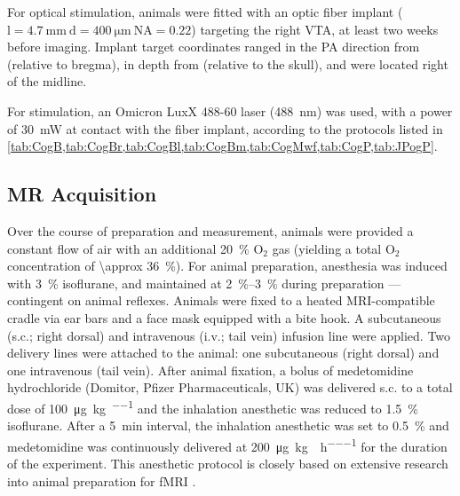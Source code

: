 For optical stimulation, animals were fitted with an optic fiber implant ($\mathrm{l=\SI{4.7}{\milli\meter} \ d=\SI{400}{\micro\meter} \ NA=0.22}$) targeting the right VTA, at least two weeks before imaging.
Implant target coordinates ranged in the PA direction from
 (relative to bregma),
in depth from
 (relative to the skull),
and were located
right of the midline.

For stimulation, an Omicron LuxX 488-60 laser (\SI{488}{\nano\meter}) was used, with a power of \SI{30}{\milli\watt} at contact with the fiber implant, according to the protocols listed in \cref{tab:CogB,tab:CogBr,tab:CogBl,tab:CogBm,tab:CogMwf,tab:CogP,tab:JPogP}.

\subsection{MR Acquisition}

Over the course of preparation and measurement, animals were provided a constant flow of air with an additional \SI{20}{\percent} $\mathrm{O_2}$ gas (yielding a total $\mathrm{O_2}$ concentration of \SI{\approx 36}{\percent}).
For animal preparation, anesthesia was induced with \SI{3}{\percent} isoflurane, and maintained at \SIrange{2}{3}{\percent} during preparation --- contingent on animal reflexes.
Animals were fixed to a heated MRI-compatible cradle via ear bars and a face mask equipped with a bite hook.
A subcutaneous (s.c.; right dorsal) and intravenous (i.v.; tail vein) infusion line were applied.
Two delivery lines were attached to the animal: one subcutaneous (right dorsal) and one intravenous (tail vein).
After animal fixation, a bolus of medetomidine hydrochloride (Domitor, Pfizer Pharmaceuticals, UK) was delivered s.c. to a total dose of \SI{100}{\micro\gram\per\kilo\gram\per\BW} and the inhalation anesthetic was reduced to \SI{1.5}{\percent} isoflurane.
After a \SI{5}{\minute} interval, the inhalation anesthetic was set to \SI{0.5}{\percent} and medetomidine was continuously delivered at \SI{200}{\micro\gram\per\kilo\gram\per\BW\per\hour} for the duration of the experiment.
This anesthetic protocol is closely based on extensive research into animal preparation for fMRI \cite{Grandjean2014}.


